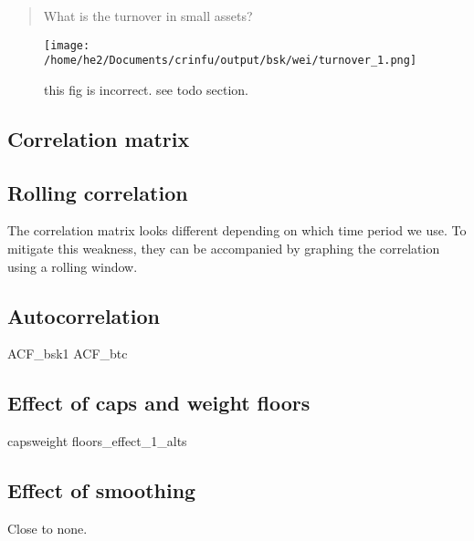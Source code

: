 \documentclass[12,]{article}
\begin{document}
\begin{quote}
What is the turnover in small assets?
\end{quote}

\begin{figure}
\centering
\texttt{[image: /home/he2/Documents/crinfu/output/bsk/wei/turnover\_1.png]}
\caption{this fig is incorrect. see todo section.}
\end{figure}

\subsection{Correlation matrix}\label{correlation-matrix}

\subsection{Rolling correlation}\label{rolling-correlation}

The correlation matrix looks different depending on which time period we
use. To mitigate this weakness, they can be accompanied by graphing the
correlation using a rolling window.

\subsection{Autocorrelation}\label{autocorrelation-1}

ACF\_bsk1 ACF\_btc

\subsection{Effect of caps and weight
floors}\label{effect-of-caps-and-weight-floors}

capsweight floors\_effect\_1\_alts

\subsection{Effect of smoothing}\label{effect-of-smoothing}

Close to none.
\end{document}
